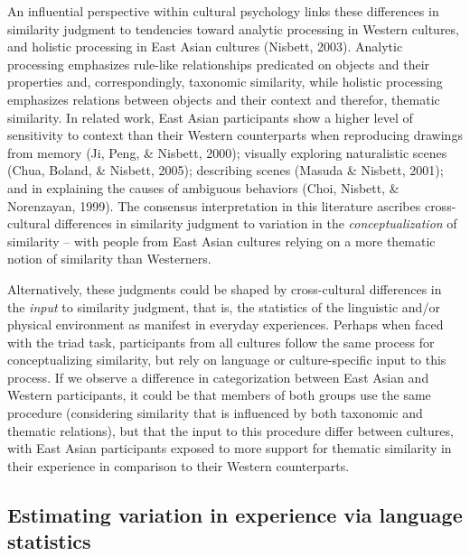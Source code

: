\documentclass[10pt, letterpaper]{article}
\begin{document}
An influential perspective within cultural psychology links these
differences in similarity judgment to tendencies toward analytic
processing in Western cultures, and holistic processing in East Asian
cultures (Nisbett, 2003). Analytic processing emphasizes rule-like
relationships predicated on objects and their properties and,
correspondingly, taxonomic similarity, while holistic processing
emphasizes relations between objects and their context and therefor,
thematic similarity. In related work, East Asian participants show a
higher level of sensitivity to context than their Western counterparts
when reproducing drawings from memory (Ji, Peng, \& Nisbett, 2000);
visually exploring naturalistic scenes (Chua, Boland, \& Nisbett, 2005);
describing scenes (Masuda \& Nisbett, 2001); and in explaining the
causes of ambiguous behaviors (Choi, Nisbett, \& Norenzayan, 1999). The
consensus interpretation in this literature ascribes cross-cultural
differences in similarity judgment to variation in the
\emph{conceptualization} of similarity -- with people from East Asian
cultures relying on a more thematic notion of similarity than
Westerners.

Alternatively, these judgments could be shaped by cross-cultural
differences in the \emph{input} to similarity judgment, that is, the
statistics of the linguistic and/or physical environment as manifest in
everyday experiences. Perhaps when faced with the triad task,
participants from all cultures follow the same process for
conceptualizing similarity, but rely on language or culture-specific
input to this process. If we observe a difference in categorization
between East Asian and Western participants, it could be that members of
both groups use the same procedure (considering similarity that is
influenced by both taxonomic and thematic relations), but that the input
to this procedure differ between cultures, with East Asian participants
exposed to more support for thematic similarity in their experience in
comparison to their Western counterparts.

\hypertarget{estimating-variation-in-experience-via-language-statistics}{%
\subsection{Estimating variation in experience via language
statistics}\label{estimating-variation-in-experience-via-language-statistics}}
\end{document}
